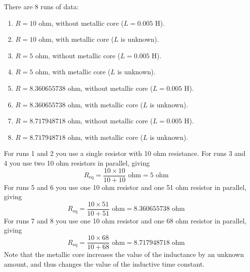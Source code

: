 There are 8 runs of data:
\begin{enumerate}
	\item $R = 10$ ohm, without metallic core ($L = 0.005$ H).
	\item $R = 10$ ohm, with metallic core ($L$ is unknown).
	\item $R = 5$ ohm, without metallic core ($L = 0.005$ H).
	\item $R = 5$ ohm, with metallic core ($L$ is unknown).
	\item $R = 8.360655738$ ohm, without metallic core ($L = 0.005$ H).
	\item $R = 8.360655738$ ohm, with metallic core ($L$ is unknown).
	\item $R = 8.717948718$ ohm, without metallic core ($L = 0.005$ H).
	\item $R = 8.717948718$ ohm, with metallic core ($L$ is unknown).
\end{enumerate}
For runs 1 and 2 you use a single resistor with 10 ohm resistance. For runs 3 and 4 you use two 10 ohm resistors in parallel, giving
\begin{equation}
	R_{\text{eq}} = \frac{10 \times 10}{10 + 10} \text{ ohm} = 5 \text{ ohm}
\end{equation}
For runs 5 and 6 you use one 10 ohm resistor and one 51 ohm resistor in parallel, giving
\begin{equation}
	R_{\text{eq}} = \frac{10 \times 51}{10 + 51} \text{ ohm} = 8.360655738 \text{ ohm}
\end{equation}
For runs 7 and 8 you use one 10 ohm resistor and one 68 ohm resistor in parallel, giving
\begin{equation}
	R_{\text{eq}} = \frac{10 \times 68}{10 + 68} \text{ ohm} = 8.717948718 \text{ ohm}
\end{equation}
Note that the metallic core increases the value of the inductance by an unknown amount, and thus changes the value of the inductive time constant.
